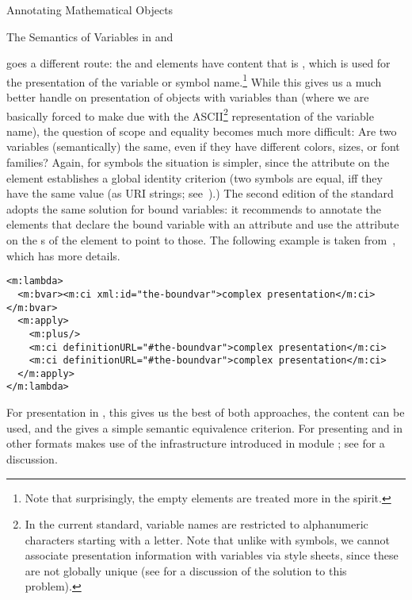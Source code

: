 \begin{omgroup}[id=annotating]{Annotating Mathematical Objects}
\begin{module}[id=omml-semvar]
\begin{omgroup}[id=sem-var,short=Semantics of Variables]{The Semantics of Variables in
  \openmath and \cmathml}
\begin{omtext}
{\mathml} goes a different route: the  and 
elements have content that is {\pmathml}, which is used for the presentation of the
variable or symbol name.\footnote{Note that surprisingly, the empty {\cmathml} elements
  are treated more in the {\openmath} spirit.}  While this gives us a much better handle
on presentation of objects with variables than {\openmath} (where we are basically forced
to make due with the ASCII\footnote{In the current {\openmath} standard, variable names
  are restricted to alphanumeric characters starting with a letter. Note that unlike with
  symbols, we cannot associate presentation information with variables via style sheets,
  since these are not globally unique (see  for a discussion of the
  \omdoc solution to this problem).}  representation of the variable name), the question
of scope and equality becomes much more difficult: Are two variables (semantically) the
same, even if they have different colors, sizes, or font families? Again, for symbols the
situation is simpler, since the  attribute on the
 element establishes a global identity criterion (two symbols are
equal, iff they have the same  value (as URI
strings; see~\cite{BerFie:uri98}).) The second edition of the {\mathml} standard adopts
the same solution for bound variables: it recommends to annotate the 
elements that declare the bound variable with an  attribute and
use the  attribute on the {s}
of the  element to point to those. The following example is taken
from~\cite{KohDev:bvm03}, which has more details.
\end{omtext}

\begin{lstlisting}[language=MathML,label=bvar-mathml,
     index={math,bvar,ci,definitionURL}]
<m:lambda>
  <m:bvar><m:ci xml:id="the-boundvar">complex presentation</m:ci></m:bvar>
  <m:apply>
    <m:plus/>
    <m:ci definitionURL="#the-boundvar">complex presentation</m:ci>
    <m:ci definitionURL="#the-boundvar">complex presentation</m:ci>
  </m:apply>
</m:lambda>  
\end{lstlisting}

For presentation in {\mathml}, this gives us the best of both approaches, the
 content can be used, and the {} gives a simple
semantic equivalence criterion. For presenting {\openmath} and {\cmathml} in other
formats \omdoc makes use of the infrastructure introduced in module
{}; see  for a discussion.
\end{omgroup}
\end{module}


\end{omgroup}
